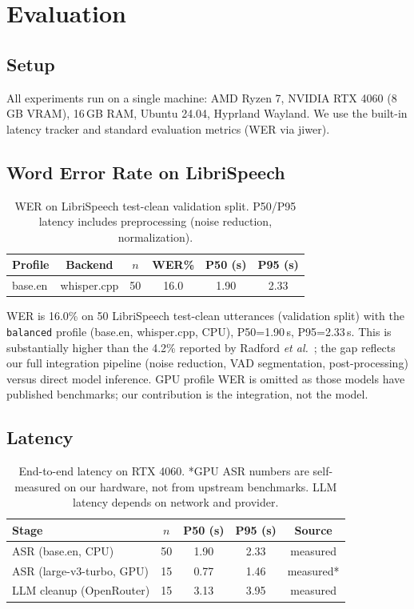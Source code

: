 \documentclass[11pt]{article}
\begin{document}
\section{Evaluation}

\subsection{Setup}

All experiments run on a single machine: AMD Ryzen 7, NVIDIA RTX 4060 (8\,GB VRAM),
16\,GB RAM, Ubuntu 24.04, Hyprland Wayland. We use the built-in latency tracker and
standard evaluation metrics (WER via jiwer).

\subsection{Word Error Rate on LibriSpeech}

\begin{table}[t]
\centering
\small
\begin{tabular}{@{}lccccc@{}}
\toprule
\textbf{Profile} & \textbf{Backend} & \textbf{$n$} & \textbf{WER\%} & \textbf{P50 (s)} & \textbf{P95 (s)} \\
\midrule
base.en & whisper.cpp & 50 & 16.0 & 1.90 & 2.33 \\
\bottomrule
\end{tabular}
\caption{WER on LibriSpeech test-clean validation split. P50/P95 latency includes
preprocessing (noise reduction, normalization).}
\label{tab:wer}
\end{table}

WER is 16.0\% on 50 LibriSpeech test-clean utterances (validation split) with the
\texttt{balanced} profile (base.en, whisper.cpp, CPU), P50=1.90\,s, P95=2.33\,s. This
is substantially higher than the 4.2\% reported by Radford \emph{et al.}~\cite{radford2023robust};
the gap reflects our full integration pipeline (noise reduction, VAD segmentation,
post-processing) versus direct model inference. GPU profile WER is omitted as those
models have published benchmarks; our contribution is the integration, not the model.

\subsection{Latency}

\begin{table}[t]
\centering
\small
\begin{tabular}{@{}lcccc@{}}
\toprule
\textbf{Stage} & \textbf{$n$} & \textbf{P50 (s)} & \textbf{P95 (s)} & \textbf{Source} \\
\midrule
ASR (base.en, CPU) & 50 & 1.90 & 2.33 & measured \\
ASR (large-v3-turbo, GPU) & 15 & 0.77 & 1.46 & measured* \\
LLM cleanup (OpenRouter) & 15 & 3.13 & 3.95 & measured \\
\bottomrule
\end{tabular}
\caption{End-to-end latency on RTX 4060. *GPU ASR numbers are self-measured on our
hardware, not from upstream benchmarks. LLM latency depends on network and provider.}
\label{tab:latency}
\end{table}
\end{document}
